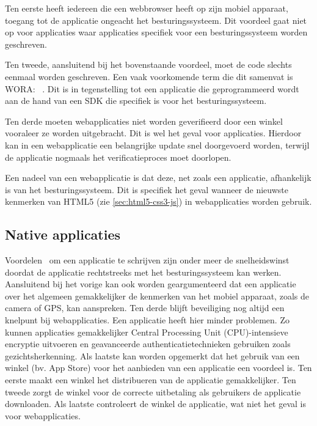 Ten eerste heeft iedereen die een webbrowser heeft op zijn mobiel apparaat, toegang tot de applicatie ongeacht het besturingssysteem.
Dit voordeel gaat niet op voor  applicaties waar applicaties specifiek voor een besturingssysteem worden geschreven.

Ten tweede, aansluitend bij het bovenstaande voordeel, moet de code slechts eenmaal worden geschreven. 
Een vaak voorkomende term die dit samenvat is WORA: ~\cite{Hales2012}. 
Dit is in tegenstelling tot een  applicatie die geprogrammeerd wordt aan de hand van een SDK die specifiek is voor het besturingssysteem.

Ten derde moeten webapplicaties niet worden geverifieerd door een winkel vooraleer ze worden uitgebracht. 
Dit is wel het geval voor  applicaties. 
Hierdoor kan in een webapplicatie een belangrijke update snel doorgevoerd worden, terwijl de  applicatie nogmaals het verificatieproces moet doorlopen.

Een nadeel van een webapplicatie is dat deze, net zoals een  applicatie, afhankelijk is van het besturingssysteem.
Dit is specifiek het geval wanneer de nieuwste kenmerken van HTML5 (zie \ref{sec:html5-css3-js}) in webapplicaties worden gebruik.

\subsection{Native applicaties}
\label{sec:literatuur-native}
Voordelen~\cite{Accenture2012} om een  applicatie te schrijven zijn onder meer de snelheidswinst doordat de applicatie rechtstreeks met het besturingssysteem kan werken. 
Aansluitend bij het vorige kan ook worden geargumenteerd dat een  applicatie over het algemeen gemakkelijker de kenmerken van het mobiel apparaat, zoals de camera of GPS, kan aanspreken. 
Ten derde blijft beveiliging nog altijd een knelpunt bij webapplicaties. Een  applicatie heeft hier minder problemen. 
Zo kunnen  applicaties gemakkelijker Central Processing Unit (CPU)-intensieve encryptie uitvoeren en geavanceerde authenticatietechnieken gebruiken zoals gezichtsherkenning.
Als laatste kan worden opgemerkt dat het gebruik van een winkel (bv. App Store) voor het aanbieden van een applicatie een voordeel is.
Ten eerste maakt een winkel het distribueren van de applicatie gemakkelijker.
Ten tweede zorgt de winkel voor de correcte uitbetaling als gebruikers de applicatie downloaden.
Als laatste controleert de winkel de applicatie, wat niet het geval is voor webapplicaties.

